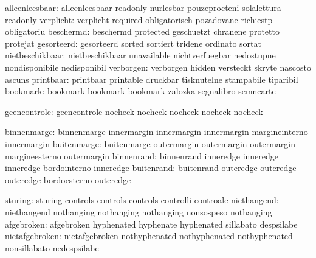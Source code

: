            alleenleesbaar: alleenleesbaar            readonly
                           nurlesbar                 pouzeprocteni
                           solalettura               readonly
                verplicht: verplicht                 required
                           obligatorisch             pozadovane
                           richiestp                 obligatoriu
                beschermd: beschermd                 protected
                           geschuetzt                chranene
                           protetto                  protejat
               gesorteerd: gesorteerd                sorted
                           sortiert                  tridene
                           ordinato                  sortat
          nietbeschikbaar: nietbeschikbaar           unavailable
                           nichtverfuegbar           nedostupne
                           nondisponibile            nedisponibil
                verborgen: verborgen                 hidden
                           versteckt                 skryte
                           nascosto                  ascuns
                printbaar: printbaar                 printable
                           druckbar                  tisknutelne
                           stampabile                tiparibil
                 bookmark: bookmark                  bookmark
                           bookmark                  zalozka
                           segnalibro                semncarte

geencontrole: geencontrole  nocheck
              nocheck       nocheck
              nocheck       nocheck


              binnenmarge: binnenmarge               innermargin
                           innermargin               innermargin
                           margineinterno            innermargin
              buitenmarge: buitenmarge               outermargin
                           outermargin               outermargin
                           margineesterno            outermargin
               binnenrand: binnenrand                inneredge
                           inneredge                 inneredge
                           bordointerno              inneredge
               buitenrand: buitenrand                outeredge
                           outeredge                 outeredge
                           bordoesterno              outeredge

                  sturing: sturing                   controls
                           controls                  controls
                           controlli                 controale
              niethangend: niethangend               nothanging
                           nothanging                nothanging
                           nonsospeso                nothanging
               afgebroken: afgebroken                hyphenated
                           hyphenate                 hyphenated
                           sillabato                 despsilabe
           nietafgebroken: nietafgebroken            nothyphenated
                           nothyphenated             nothyphenated
                           nonsillabato              nedespsilabe


